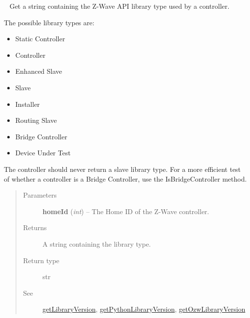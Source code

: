 \documentclass[letterpaper,10pt,english]{sphinxmanual}
\begin{document}
\begin{fulllineitems}
\begin{fulllineitems}
\begin{quote}
\begin{description}
\end{description}\end{quote}

\end{fulllineitems}


\begin{fulllineitems}
\label{libopenzwave:libopenzwave.PyManager.getLibraryTypeName}~\label{libopenzwave:getlibrarytypename}
Get a string containing the Z-Wave API library type used by a controller.

The possible library types are:
\begin{itemize}
\item {} 
Static Controller

\item {} 
Controller

\item {} 
Enhanced Slave

\item {} 
Slave

\item {} 
Installer

\item {} 
Routing Slave

\item {} 
Bridge Controller

\item {} 
Device Under Test

\end{itemize}

The controller should never return a slave library type.  For a more efficient
test of whether a controller is a Bridge Controller, use the IsBridgeController
method.
\begin{quote}\begin{description}
\item[{Parameters}] \leavevmode
\textbf{homeId} (\emph{int}) -- The Home ID of the Z-Wave controller.

\item[{Returns}] \leavevmode
A string containing the library type.

\item[{Return type}] \leavevmode
str

\item[{See}] \leavevmode
{\hyperref[libopenzwave:getlibraryversion]{getLibraryVersion}}, {\hyperref[libopenzwave:getpythonlibraryversion]{getPythonLibraryVersion}}, {\hyperref[libopenzwave:getozwlibraryversion]{getOzwLibraryVersion}}


\end{description}
\end{quote}
\end{fulllineitems}
\end{fulllineitems}
\end{document}

